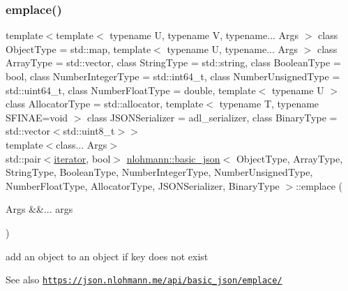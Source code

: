 \subsubsection{\texorpdfstring{emplace()}{emplace()}}
{\footnotesize\ttfamily template$<$template$<$ typename U, typename V, typename... Args $>$ class Object\+Type = std\+::map, template$<$ typename U, typename... Args $>$ class Array\+Type = std\+::vector, class String\+Type  = std\+::string, class Boolean\+Type  = bool, class Number\+Integer\+Type  = std\+::int64\+\_\+t, class Number\+Unsigned\+Type  = std\+::uint64\+\_\+t, class Number\+Float\+Type  = double, template$<$ typename U $>$ class Allocator\+Type = std\+::allocator, template$<$ typename T, typename S\+F\+I\+N\+A\+E=void $>$ class J\+S\+O\+N\+Serializer = adl\+\_\+serializer, class Binary\+Type  = std\+::vector$<$std\+::uint8\+\_\+t$>$$>$ \\
template$<$class... Args$>$ \\
std\+::pair$<$\hyperlink{classnlohmann_1_1basic__json_aa549b2b382916b3baafb526e5cb410bd}{iterator}, bool$>$ \hyperlink{classnlohmann_1_1basic__json}{nlohmann\+::basic\+\_\+json}$<$ Object\+Type, Array\+Type, String\+Type, Boolean\+Type, Number\+Integer\+Type, Number\+Unsigned\+Type, Number\+Float\+Type, Allocator\+Type, J\+S\+O\+N\+Serializer, Binary\+Type $>$\+::emplace (\begin{DoxyParamCaption}\item[{Args \&\&...}]{args }\end{DoxyParamCaption})\hspace{0.3cm}{\ttfamily [inline]}}



add an object to an object if key does not exist 

\begin{DoxySeeAlso}{See also}
\href{https://json.nlohmann.me/api/basic_json/emplace/}{\tt https\+://json.\+nlohmann.\+me/api/basic\+\_\+json/emplace/} 
\end{DoxySeeAlso}
\mbox{\label{classnlohmann_1_1basic__json_a15c0a5db4fb12d49433801bbe6436bfb}} 
